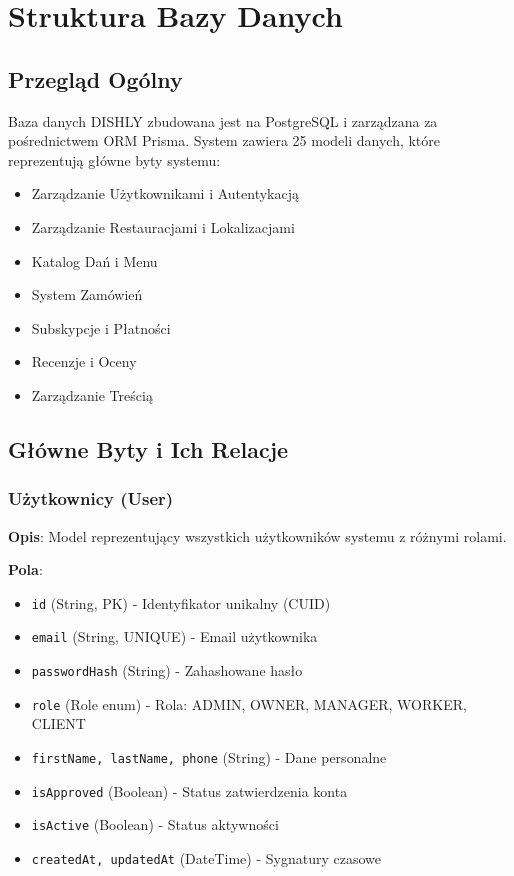 ﻿\documentclass[12pt,a4paper,utf-8]{article}
\begin{document}
\newpage

\section{Struktura Bazy Danych}

\subsection{Przegląd Ogólny}

Baza danych DISHLY zbudowana jest na PostgreSQL i zarządzana za pośrednictwem ORM Prisma. System zawiera 25 modeli danych, które reprezentują główne byty systemu:

\begin{itemize}
    \item Zarządzanie Użytkownikami i Autentykacją
    \item Zarządzanie Restauracjami i Lokalizacjami
    \item Katalog Dań i Menu
    \item System Zamówień
    \item Subskypcje i Płatności
    \item Recenzje i Oceny
    \item Zarządzanie Treścią
\end{itemize}

\subsection{Główne Byty i Ich Relacje}

\subsubsection{Użytkownicy (User)}

\textbf{Opis}: Model reprezentujący wszystkich użytkowników systemu z różnymi rolami.

\textbf{Pola}:
\begin{itemize}
    \item \texttt{id} (String, PK) - Identyfikator unikalny (CUID)
    \item \texttt{email} (String, UNIQUE) - Email użytkownika
    \item \texttt{passwordHash} (String) - Zahashowane hasło
    \item \texttt{role} (Role enum) - Rola: ADMIN, OWNER, MANAGER, WORKER, CLIENT
    \item \texttt{firstName, lastName, phone} (String) - Dane personalne
    \item \texttt{isApproved} (Boolean) - Status zatwierdzenia konta
    \item \texttt{isActive} (Boolean) - Status aktywności
    \item \texttt{createdAt, updatedAt} (DateTime) - Sygnatury czasowe
\end{itemize}
\end{document}
